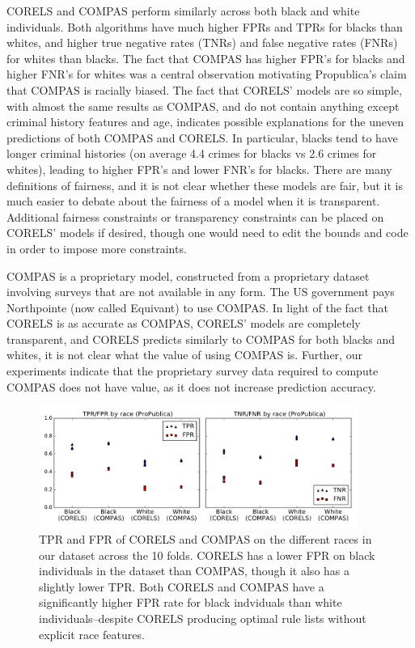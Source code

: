 CORELS and COMPAS perform similarly across both black and white individuals.
%
Both algorithms have much higher FPRs and TPRs for blacks than whites, and higher true negative rates (TNRs) and false negative rates (FNRs) for whites than blacks. 
%
The fact that COMPAS has higher FPR's for blacks and higher FNR's for whites was a central observation motivating Propublica's claim that COMPAS is racially biased. 
%
The fact that CORELS' models are so simple, with almost the same results as COMPAS, and do not contain anything except criminal history features and age, indicates possible explanations for the uneven predictions of both COMPAS and CORELS. 
%
In particular, blacks tend to have longer criminal histories (on average 4.4 crimes for blacks vs 2.6 crimes for whites), leading to higher FPR's and lower FNR's for blacks.
%
There are many definitions of fairness, and it is not clear whether these models are fair, but it is much easier to debate about the fairness of a model when it is transparent. 
%
Additional fairness constraints or transparency constraints can be placed on CORELS' models if desired, though one would need to edit the bounds and code in order to impose more constraints.

COMPAS is a proprietary model, constructed from a proprietary dataset involving surveys that are not available in any form. 
%
The US government pays Northpointe (now called Equivant) to use COMPAS.
%
In light of the fact that CORELS is as accurate as COMPAS, CORELS' models are completely transparent, and CORELS predicts similarly to COMPAS for both blacks and whites, it is not clear what the value of using COMPAS is. 
%
Further, our experiments indicate that the proprietary survey data required to compute COMPAS does not have value, as it does not increase prediction accuracy.

\begin{figure}[t!]
\begin{center}
\includegraphics[trim={12mm, 0mm, 24mm, 0mm},
width=0.93\textwidth]{figs/compas-corels-comparison.pdf}
\end{center}
\caption{TPR and FPR of CORELS and COMPAS on the different races in our dataset across the 10 folds.
%
CORELS has a lower FPR on black individuals in the dataset than COMPAS, though it also has a slightly lower TPR.
%
Both CORELS and COMPAS have a significantly higher FPR rate for black indviduals than white individuals--despite CORELS producing optimal rule lists without explicit race features.
%
}
\label{fig:tpr-fpr}
\end{figure}

